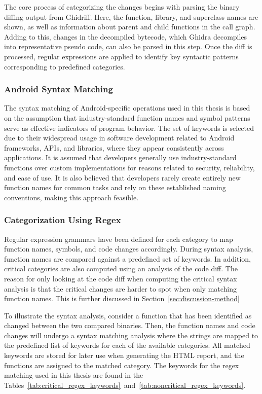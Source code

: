 The core process of categorizing the changes begins with parsing the binary diffing output from Ghidriff. Here, the function, library, and superclass names are shown, as well as information about parent and child functions in the call graph. Adding to this, changes in the decompiled bytecode, which Ghidra decompiles into representative pseudo code, can also be parsed in this step. Once the diff is processed, regular expressions are applied to identify key syntactic patterns corresponding to predefined categories. 




\subsubsection{Android Syntax Matching}
The syntax matching of Android-specific operations used in this thesis is based on the assumption that industry-standard function names and symbol patterns serve as effective indicators of program behavior. The set of keywords is selected due to their widespread usage in software development related to Android frameworks, APIs, and libraries, where they appear consistently across applications. It is assumed that developers generally use industry-standard functions over custom implementations for reasons related to security, reliability, and ease of use. It is also believed that developers rarely create entirely new function names for common tasks and rely on these established naming conventions, making this approach feasible.




\subsubsection{Categorization Using Regex}
Regular expression grammars have been defined for each category to map function names, symbols, and code changes accordingly. During syntax analysis, function names are compared against a predefined set of keywords. In addition, critical categories are also computed using an analysis of the code diff. The reason for only looking at the code diff when computing the critical syntax analysis is that the critical changes are harder to spot when only matching function names. This is further discussed in Section~\ref{sec:discussion-method}

To illustrate the syntax analysis, consider a function that has been identified as changed between the two compared binaries. Then, the function names and code changes will undergo a syntax matching analysis where the strings are mapped to the predefined list of keywords for each of the available categories. All matched keywords are stored for later use when generating the HTML report, and the functions are assigned to the matched category. The keywords for the regex matching used in this thesis are found in the Tables~\ref{tab:critical_regex_keywords}~and~\ref{tab:noncritical_regex_keywords}.\textbf{}

